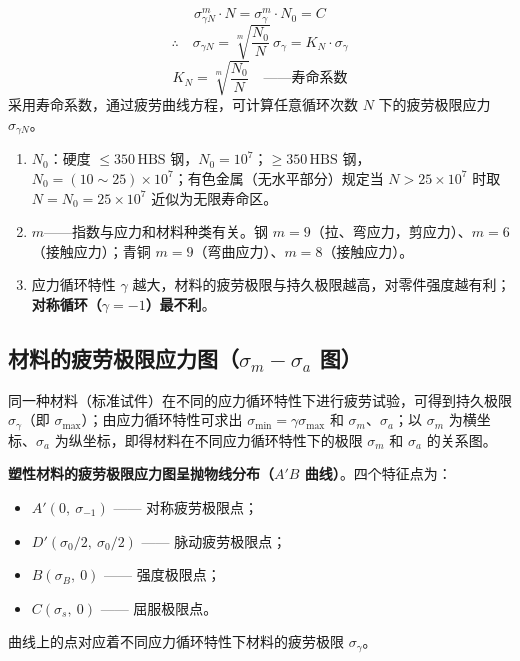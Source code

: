 \begin{theorem}[疲劳曲线方程]
\label{thm:疲劳曲线方程}
\begin{equation}
	\sigma_{\gamma N}^m \cdot N = \sigma_\gamma^m \cdot N_0 = C
	\label{eq:强度:疲劳曲线方程}
\end{equation}
\begin{equation}
	\therefore\quad \sigma_{\gamma N}=\sqrt[m]{\frac{N_0}{N}}\,\sigma_\gamma = K_N\cdot\sigma_\gamma
	\label{eq:强度:疲劳极限有限寿命}
\end{equation}
\begin{equation}
	K_N=\sqrt[m]{\frac{N_0}{N}}\quad\text{——寿命系数}
	\label{eq:强度:寿命系数}
\end{equation}
采用寿命系数，通过疲劳曲线方程，可计算任意循环次数 $N$ 下的疲劳极限应力 $\sigma_{\gamma N}$。
\end{theorem}

\begin{note}
\begin{enumerate}
	\item $N_0$：硬度 $\le350\,\text{HBS}$ 钢，$N_0=10^7$；$\ge350\,\text{HBS}$ 钢，$N_0=(10\sim25)\times10^7$；有色金属（无水平部分）规定当 $N>25\times10^7$ 时取 $N=N_0=25\times10^7$ 近似为无限寿命区。
	\item $m$——指数与应力和材料种类有关。钢 $m=9$（拉、弯应力，剪应力）、$m=6$（接触应力）；青铜 $m=9$（弯曲应力）、$m=8$（接触应力）。
	\item 应力循环特性 $\gamma$ 越大，材料的疲劳极限与持久极限越高，对零件强度越有利；\textbf{对称循环（$\gamma=-1$）最不利}。
\end{enumerate}
\end{note}

\subsection{材料的疲劳极限应力图（\texorpdfstring{$\sigma_m-\sigma_a$}{σm-σa} 图）}

同一种材料（标准试件）在不同的应力循环特性下进行疲劳试验，可得到持久极限 $\sigma_\gamma$（即 $\sigma_{\max}$）；由应力循环特性可求出 $\sigma_{\min}=\gamma\sigma_{\max}$ 和 $\sigma_m$、$\sigma_a$；以 $\sigma_m$ 为横坐标、$\sigma_a$ 为纵坐标，即得材料在不同应力循环特性下的极限 $\sigma_m$ 和 $\sigma_a$ 的关系图。

\begin{definition}[材料的疲劳极限应力图]
\label{def:材料的疲劳极限应力图}
\textbf{塑性材料的疲劳极限应力图呈抛物线分布（$A'B$ 曲线）}。四个特征点为：
\begin{itemize}
	\item $A'(0,\ \sigma_{-1})$ —— 对称疲劳极限点；
	\item $D'(\sigma_0/2,\ \sigma_0/2)$ —— 脉动疲劳极限点；
	\item $B(\sigma_B,\ 0)$ —— 强度极限点；
	\item $C(\sigma_s,\ 0)$ —— 屈服极限点。
\end{itemize}
曲线上的点对应着不同应力循环特性下材料的疲劳极限 $\sigma_\gamma$。
\end{definition}


